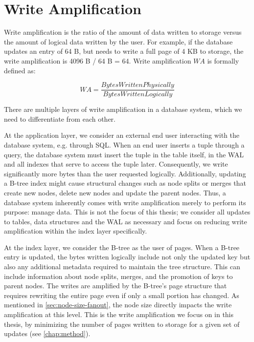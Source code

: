 \section{Write Amplification}
Write amplification is the ratio of the amount of data written to storage versus the amount of logical data written by the user.
For example, if the database updates an entry of 64 B, but needs to write a full page of 4 KB to storage, the write amplification is 4096 B / 64 B = 64.
Write amplification $WA$ is formally defined as:

\[
WA = \frac{Bytes Written Physically}{Bytes Written Logically}
\]

There are multiple layers of write amplification in a database system, which we need to differentiate from each other.

At the application layer, we consider an external end user interacting with the database system, e.g. through SQL.
When an end user inserts a tuple through a query, the database system must insert the tuple in the table itself, in the \ac{WAL} and all indexes that serve to access the tuple later.
Consequently, we write significantly more bytes than the user requested logically.
Additionally, updating a B-tree index might cause structural changes such as node splits or merges that create new nodes, delete new nodes and update the parent nodes.
Thus, a database system inherently comes with write amplification merely to perform its purpose: manage data.
This is not the focus of this thesis; we consider all updates to tables, data structures and the \ac{WAL} as necessary and focus on reducing write amplification within the index layer specifically.

At the index layer, we consider the B-tree as the user of pages.
When a B-tree entry is updated, the bytes written logically include not only the updated key but also any additional metadata required to maintain the tree structure.
This can include information about node splits, merges, and the promotion of keys to parent nodes.
The writes are amplified by the B-tree's page structure that requires rewriting the entire page even if only a small portion has changed.
As mentioned in \autoref{sec:node-size-fanout}, the node size directly impacts the write amplification at this level.
This is the write amplification we focus on in this thesis, by minimizing the number of pages written to storage for a given set of updates (see \autoref{chap:method}).

